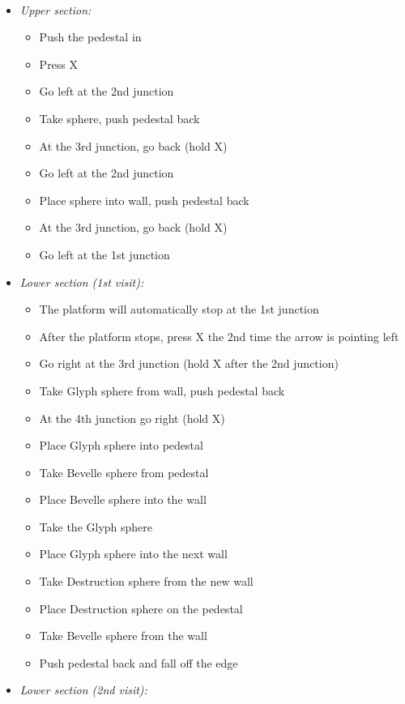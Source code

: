 \bothvfill
\winvfill
\lossvfill
\ 
\begin{trial}
	\begin{itemize}
		\item \textit{Upper section:}
			\begin{itemize}
				\item Push the pedestal in
				\item Press X
				\item Go left at the 2nd junction
				\item Take sphere, push pedestal back
				\item At the 3rd junction, go back (hold X)
				\item Go left at the 2nd junction
				\item Place sphere into wall, push pedestal back
				\item At the 3rd junction, go back (hold X)
				\item Go left at the 1st junction
			\end{itemize}
		\item \textit{Lower section (1st visit):}
			\begin{itemize}
				\item The platform will automatically stop at the 1st junction
				\item After the platform stops, press X the 2nd time the arrow is pointing left
				\item Go right at the 3rd junction (hold X after the 2nd junction)
				\item Take Glyph sphere from wall, push pedestal back
				\item At the 4th junction go right (hold X)
				\item Place Glyph sphere into pedestal
				\item Take Bevelle sphere from pedestal
				\item Place Bevelle sphere into the wall
				\item Take the Glyph sphere
				\item Place Glyph sphere into the next wall
				\item Take Destruction sphere from the new wall
				\item Place Destruction sphere on the pedestal
				\item Take Bevelle sphere from the wall
				\item Push pedestal back and fall off the edge
			\end{itemize}
		\item \textit{Lower section (2nd visit):}

\end{itemize}
\end{trial}
